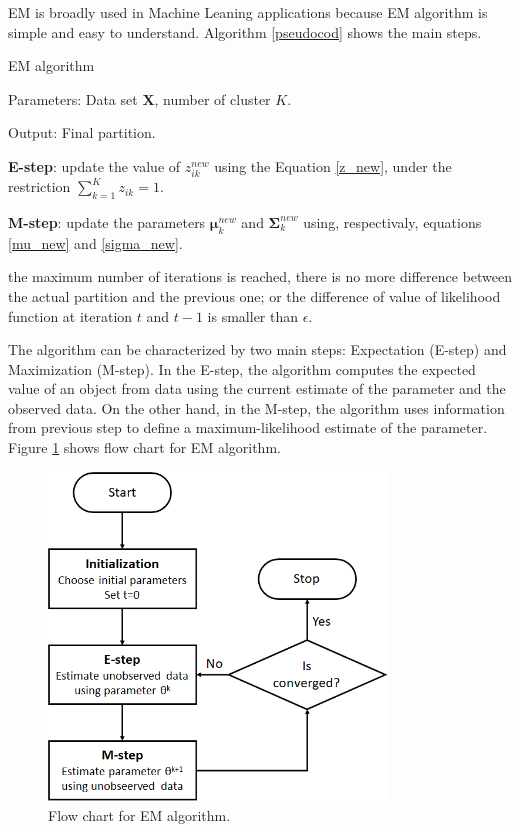EM is broadly used in Machine Leaning applications because EM algorithm is simple and easy to understand. Algorithm \ref{pseudocod} shows the main steps.

\begin{algorithm}[ht]
	\caption{EM algorithm}
	\label{pseudocod}
    
    Parameters: Data set $\textbf{X}$, number of cluster $K$.
    
    Output: Final partition.
    
	\begin{algorithmic}[1] 
		
        \REPEAT
		
		\STATE \textbf{E-step}: update the value of $z_{ik}^{new}$ using the Equation \ref{z_new}, under the restriction $\sum_{k=1}^K z_{ik}=1$.
		
		\STATE \textbf{M-step}: update the parameters $\bm{\mu}_k^{new}$ and $\bm{\Sigma}_k^{new}$ using, respectivaly, equations \ref{mu_new} and \ref{sigma_new}.
				
		\UNTIL the maximum number of iterations is reached, there is no more difference between the actual partition and the previous one; or the difference of value of likelihood function at iteration $t$ and $t-1$ is smaller than $\epsilon$. 
		
	\end{algorithmic}
	
\end{algorithm}


The algorithm can be characterized by two main steps: Expectation (E-step) and Maximization (M-step). In the E-step, the algorithm computes the expected value of an object from data using the current estimate of the parameter and the observed data. On the other hand, in the M-step, the algorithm uses information from previous step to define a maximum-likelihood estimate of the parameter. Figure \ref{EM-algorithm} shows flow chart for EM algorithm.

\begin{figure}[ht]
\centering
\includegraphics[width=9cm]{Part 3 - Learning Systems/Unsupervised Learning/Expectation-Maximization/figures/algorithm.png}
\caption{Flow chart for EM algorithm.}
\label{EM-algorithm}
\end{figure}

